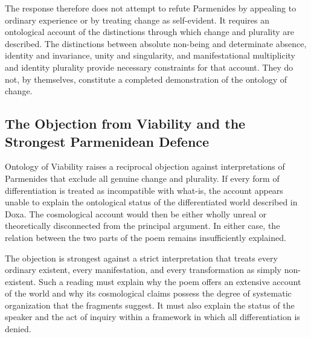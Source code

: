 
The response therefore does not attempt
to refute Parmenides by appealing to
ordinary experience or by treating change
as self-evident. It requires an ontological
account of the distinctions through which
change and plurality are described.
The distinctions between absolute non-being
and determinate absence, identity and
invariance, unity and singularity, and
manifestational multiplicity and identity
plurality provide necessary constraints
for that account. They do not, by
themselves, constitute a completed
demonstration of the ontology of change.


\subsection{The Objection from Viability and the Strongest Parmenidean Defence}


Ontology of Viability raises a reciprocal
objection against interpretations of
Parmenides that exclude all genuine
change and plurality. If every form of
differentiation is treated as incompatible
with what-is, the account appears unable
to explain the ontological status of
the differentiated world described
in Doxa. The cosmological account
would then be either wholly unreal
or theoretically disconnected from
the principal argument. In either case,
the relation between the two parts
of the poem remains insufficiently
explained.


The objection is strongest against a
strict interpretation that treats every
ordinary existent, every manifestation,
and every transformation as simply
non-existent. Such a reading must
explain why the poem offers an extensive
account of the world and why its
cosmological claims possess the
degree of systematic organization
that the fragments suggest. It must
also explain the status of the speaker
and the act of inquiry within a
framework in which all differentiation
is denied.


